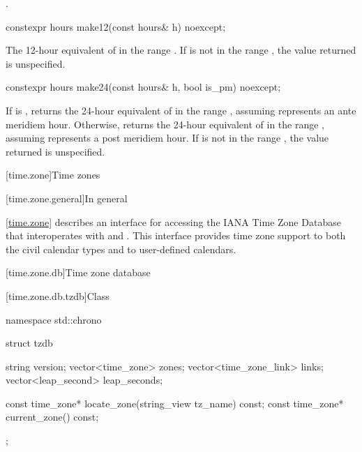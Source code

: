 \begin{itemdescr}
\pnum
\returns
{}.
\end{itemdescr}

%
\begin{itemdecl}
constexpr hours make12(const hours& h) noexcept;
\end{itemdecl}

\begin{itemdescr}
\pnum
\returns
The 12-hour equivalent of  in the range .
If  is not in the range ,
the value returned is unspecified.
\end{itemdescr}

%
\begin{itemdecl}
constexpr hours make24(const hours& h, bool is_pm) noexcept;
\end{itemdecl}

\begin{itemdescr}
\pnum
\returns
If  is ,
returns the 24-hour equivalent of 
in the range ,
assuming  represents an ante meridiem hour.
Otherwise,
returns the 24-hour equivalent of 
in the range ,
assuming  represents a post meridiem hour.
If  is not in the range ,
the value returned is unspecified.
\end{itemdescr}

[time.zone]{Time zones}

[time.zone.general]{In general}

\pnum
\ref{time.zone} describes an interface for accessing
the IANA Time Zone Database
that interoperates with  and .
This interface provides time zone support to
both the civil calendar types
and to user-defined calendars.

[time.zone.db]{Time zone database}

[time.zone.db.tzdb]{Class }

\begin{codeblock}
namespace std::chrono {
  struct tzdb {
    string                 version;
    vector<time_zone>      zones;
    vector<time_zone_link> links;
    vector<leap_second>    leap_seconds;

    const time_zone* locate_zone(string_view tz_name) const;
    const time_zone* current_zone() const;
  };
}
\end{codeblock}

